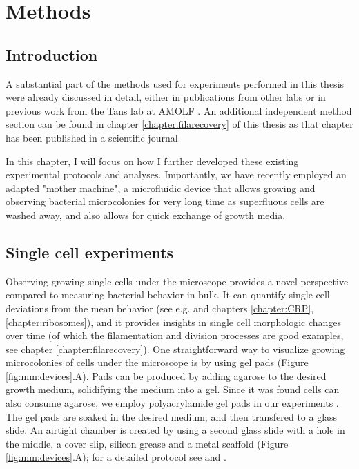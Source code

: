 



% 


\chapter{Methods}
\label{chapter:methods}

\section{Introduction}

A substantial part of the methods used for experiments performed in this thesis were already discussed in detail, either in publications from other labs \cite{Dunlop2008,Young2012} or in previous work from the Tans lab at AMOLF \cite{Kiviet2010, Walker2016t, Gude2016}. An additional independent method section can be found in chapter \ref{chapter:filarecovery} of this thesis as that chapter has been published in a scientific journal. %

In this chapter, I will focus on how I further developed these existing experimental protocols and analyses. %
Importantly, we have recently employed an adapted "mother machine", a microfluidic device that allows growing and observing bacterial microcolonies for very long time as superfluous cells are washed away, and also allows for quick exchange of growth media.

\section{Single cell experiments}

Observing growing single cells under the microscope provides a novel perspective compared to measuring bacterial behavior in bulk.
It can quantify single cell deviations from the mean behavior (see e.g. \cite{Elowitz2002, Kiviet2014} and chapters \ref{chapter:CRP}, \ref{chapter:ribosomes}), and it provides insights in single cell morphologic changes over time (of which the filamentation and division processes are good examples, see chapter \ref{chapter:filarecovery}).
%
One straightforward way to visualize growing microcolonies of cells under the microscope is by using gel pads \cite{Elowitz2002, Dunlop2008, Dong2010, Kiviet2010, Young2012, Kiviet2014} (Figure \ref{fig:mm:devices}.A).
Pads can be produced by adding agarose to the desired growth medium, solidifying the medium into a gel.
Since it was found cells can also consume agarose, we employ polyacrylamide gel pads in our experiments \cite{Kiviet2010}. The gel pads are soaked in the desired medium, and then transfered to a glass slide. An airtight chamber is created by using a second glass slide with a hole in the middle, a cover slip, silicon grease and a metal scaffold (Figure \ref{fig:mm:devices}.A); for a detailed protocol see \cite{Walker2016t} and \cite{Young2012}.


